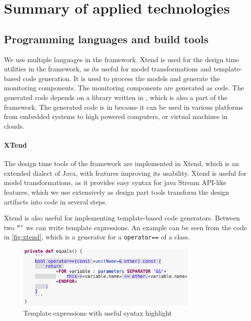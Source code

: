 \chapter{Summary of applied technologies}

\section{Programming languages and build tools}

We use multiple languages in the framework. 
Xtend is used for the design time utilities in the framework, as its useful for model transformations and template-based code generation.
It is used to process the models and generate the monitoring components. 
The monitoring components are generated as \cpp{} code.
The generated code depends on a library written in \cpp{}, which is also a part of the framework.
The generated code is in \cpp{} because it can be used in various platforms from embedded systems to high powered computers, or virtual machines in clouds.


\subsubsection{XTend}
The design time tools of the framework are implemented in Xtend\cite{xtend}, which is an extended dialect of Java, with features improving its usability.
Xtend is useful for model transformations, as it provides easy syntax for java Stream API-like features, which we use extensively as design part tools transform the design artifacts into code in several steps.

Xtend is also useful for implementing template-based code generators. 
Between two \texttt{'''} we can write template expressions.
An example can be seen from the code in \autoref{fig:xtend}, which is a generator for a \cpp{} \texttt{operator==} of a class.


\begin{figure}[H]
	\begin{center}
		\includegraphics[width=0.8\textwidth]{figures/xtend.png}
		\caption{Template expressions with useful syntax highlight }
		\label{fig:xtend}
	\end{center}
\end{figure}

